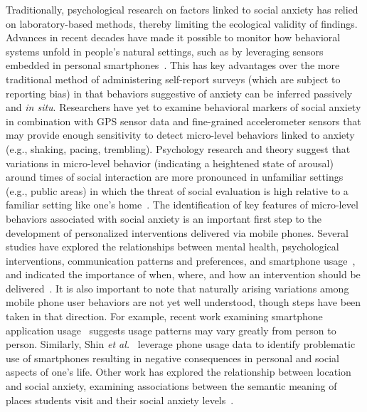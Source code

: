 Traditionally, psychological research on factors linked to social anxiety has relied on laboratory-based methods, thereby limiting the ecological validity of findings.   Advances in recent decades have made it possible to monitor how behavioral systems unfold in people's natural settings, such as by leveraging sensors embedded in personal smartphones~\cite{saeb2015,steinhubl2015emerging,kumar2013mobile,huang2016assessing,gao2016smartphone,rachuri2010emotionsense}. This has key advantages over the more traditional method of administering self-report surveys (which are subject to reporting bias) in that behaviors suggestive of anxiety can be inferred passively and \emph{in situ}.  Researchers have yet to examine behavioral markers of social anxiety in combination with GPS sensor data and fine-grained accelerometer sensors that may provide enough sensitivity to detect micro-level behaviors linked to anxiety (e.g., shaking, pacing, trembling).  Psychology research and theory suggest that variations in micro-level behavior (indicating a heightened state of arousal) around times of social interaction are more pronounced in unfamiliar settings (e.g., public areas) in which the threat of social evaluation is high relative to a familiar setting like one's home~\cite{beidel1999,norton2001}. 
The identification of key features of micro-level behaviors associated with social anxiety is an important first step to the development of personalized interventions delivered via mobile phones. Several studies have explored the relationships between mental health, psychological interventions, communication patterns and preferences, and smartphone usage~\cite{reid2004insights,reid2007text,lepp2014relationship,park2016uses, lundy2016social,schroeder2016individual,enez2016smartphone,Shalom2015social,skierkowski2012text,jin2010person,takao2009addictive}, and indicated the importance of when, where, and how an intervention should be delivered~\cite{goldstein2017return,bekiroglu2016control,nahum2016just}. It is also important to note that naturally arising variations among mobile phone user behaviors are not yet well understood, though steps have been taken in that direction. For example, recent work examining smartphone application usage~\cite{zhao2016discovering} suggests usage patterns may vary greatly from person to person.  Similarly, Shin \emph{et al.}~\cite{shin2013automatically} leverage phone usage data to identify problematic use of smartphones resulting in negative consequences in personal and social aspects of one's life. Other work has explored the relationship between location and social anxiety, examining associations between the semantic meaning of places students visit and their social anxiety levels~\cite{huang2016assessing}.
